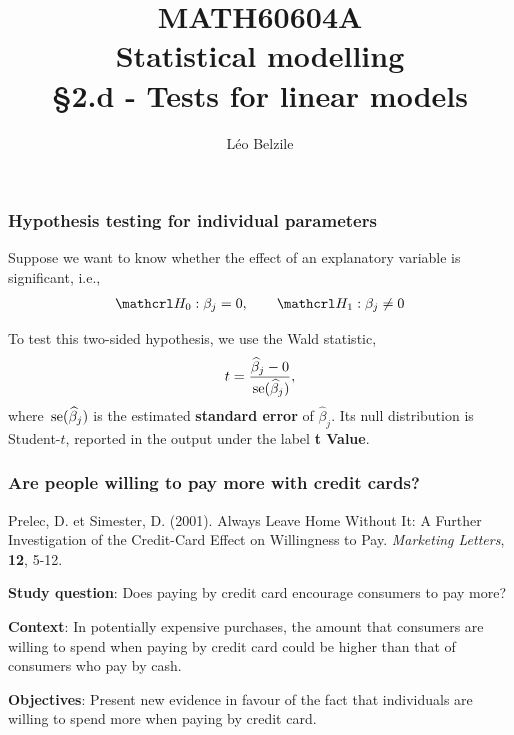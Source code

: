 \documentclass{beamer}
\title[\color{white}{MATH60604A Tests for linear models}]{\texorpdfstring{MATH60604A \\Statistical modelling \\ \S 2.d - Tests for linear models}{MATH60604A \\Statistical modelling \\ \S~2.d - Tests for linear models}}
\author{Léo Belzile}
\institute{HEC Montréal\\
Department of Decision Sciences}
\date{}
\begin{document}
\frame{\titlepage}


 \begin{frame}
\frametitle{Hypothesis testing for individual parameters}
\bi
\item Suppose we want to know whether the effect of an explanatory variable is significant, i.e.,
\begin{align*}
\Hy_0: \beta_j=0,  \qquad  \Hy_1: \beta_j\neq 0
\end{align*}
\item To test this two-sided hypothesis, we use the Wald statistic,
\begin{align*}
t=\frac{\widehat{\beta}_j-0}{\,\mathrm{se}(\widehat{\beta}_j)}, 
\end{align*}
where $\,\mathrm{se}(\widehat{\beta}_j)$ is the estimated \textbf{standard error} of $\widehat{\beta}_j$. Its null distribution is Student-$t$, reported in the \SASlang output under the label \textbf{t Value}.
\ei
\end{frame}


\begin{frame}
\frametitle{Are people willing to pay more with credit cards?}

\begin{tcolorbox}[colback=lightgray!30!white,colframe=lightgray!75!black,title=Reference]
Prelec, D. et Simester, D. (2001). Always Leave Home Without It: A Further Investigation of the Credit-Card Effect on Willingness to Pay. \textit{Marketing Letters}, \textbf{12}, 5-12.
\end{tcolorbox}
\bi
\item \alert{\textbf{Study question}}: Does paying by credit card encourage consumers to pay more?
\item \textbf{Context}: In potentially expensive purchases, the amount that consumers are willing to spend when paying by credit card could be higher than that of consumers who pay by cash.
\item \textbf{Objectives}:  Present new evidence in favour of the fact that individuals are willing to spend more when paying by credit card. 
\ei
\end{frame}
\end{document}
